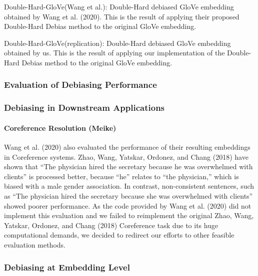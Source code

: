 \documentclass[
  english,
  man,floatsintext]{apa6}
\let\oldparagraph\paragraph
\renewcommand{\paragraph}[1]{\oldparagraph{#1}\mbox{}}
\begin{document}
Double-Hard-GloVe(Wang et al.): Double-Hard debiased GloVe embedding obtained by Wang et al. (2020). This is the result of applying their proposed Double-Hard Debias method to the original GloVe embedding.

Double-Hard-GloVe(replication): Double-Hard debiased GloVe embedding obtained by us. This is the result of applying our implementation of the Double-Hard Debias method to the original GloVe embedding.

\hypertarget{evaluation-of-debiasing-performance}{%
\subsubsection{Evaluation of Debiasing Performance}\label{evaluation-of-debiasing-performance}}

\hypertarget{debiasing-in-downstream-applications}{%
\subsubsection{Debiasing in Downstream Applications}\label{debiasing-in-downstream-applications}}

\hypertarget{coreference-resolution-meike}{%
\paragraph{Coreference Resolution (Meike)}\label{coreference-resolution-meike}}

Wang et al. (2020) also evaluated the performance of their resulting embeddings in Coreference systems. Zhao, Wang, Yatskar, Ordonez, and Chang (2018) have shown that ``The physician hired the secretary because he was overwhelmed with clients'' is processed better, because ``he'' relates to ``the physician,'' which is biased with a male gender association. In contrast, non-consistent sentences, such as ``The physician hired the secretary because she was overwhelmed with clients'' showed poorer performance.
As the code provided by Wang et al. (2020) did not implement this evaluation and we failed to reimplement the original Zhao, Wang, Yatskar, Ordonez, and Chang (2018) Coreference task due to its huge computational demands, we decided to redirect our efforts to other feasible evaluation methods.

\hypertarget{debiasing-at-embedding-level}{%
\subsubsection{Debiasing at Embedding Level}\label{debiasing-at-embedding-level}}
\end{document}
